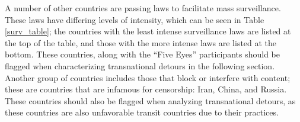 A number of other countries are passing laws to facilitate mass surveillance.  These laws have differing levels of intensity, which can be seen in Table \ref{surv_table}; the countries with the least intense surveillance laws are listed at the top of the table, and those with the more intense laws are listed at the bottom.  These countries, along with the ``Five Eyes'' participants should be flagged when characterizing transnational detours in the following section.  Another group of countries includes those that block or interfere with content; these are countries that are infamous for censorship: Iran, China, and Russia.  These countries should also be flagged when analyzing transnational detours, as these countries are also unfavorable transit countries due to their practices.  




